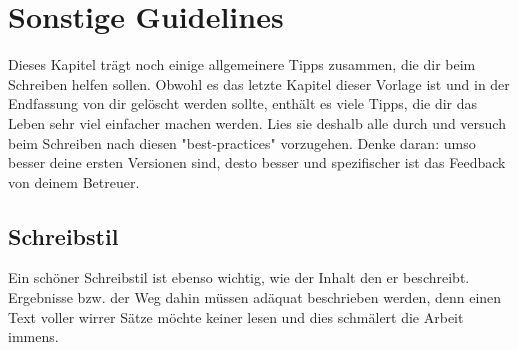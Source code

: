\chapter{Sonstige Guidelines}
Dieses Kapitel trägt noch einige allgemeinere Tipps zusammen, die dir beim Schreiben helfen sollen.
Obwohl es das letzte Kapitel dieser Vorlage ist und in der Endfassung von dir gelöscht werden sollte, enthält es viele Tipps, die dir das Leben sehr viel einfacher machen werden.
Lies sie deshalb alle durch und versuch beim Schreiben nach diesen "best-practices" vorzugehen.
Denke daran: umso besser deine ersten Versionen sind, desto besser und spezifischer ist das Feedback von deinem Betreuer.

\section{Schreibstil}
Ein schöner Schreibstil ist ebenso wichtig, wie der Inhalt den er beschreibt. 
Ergebnisse bzw. der Weg dahin müssen adäquat beschrieben werden, denn einen Text voller wirrer Sätze möchte keiner lesen und dies schmälert die Arbeit immens.

